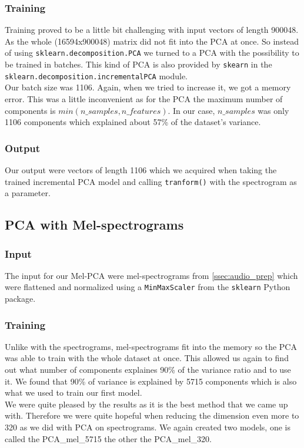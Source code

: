 \subsubsection{Training}
Training proved to be a little bit challenging with input vectors of length 900048. As the whole (16594x900048) matrix did not fit into the PCA at once. So instead of using \texttt{sklearn.decomposition.PCA} we turned to a PCA with the possibility to be trained in batches. This kind of PCA is also provided by \texttt{skearn} in the \texttt{sklearn.decomposition.incrementalPCA} module. \\ Our batch size was 1106. Again, when we tried to increase it, we got a memory error. This was a little inconvenient as for the PCA the maximum number of components is $min(n\_samples, n\_features)$. In our case, $n\_samples$ was only 1106 components which explained about 57\% of the dataset's variance.
\subsubsection{Output}
Our output were vectors of length 1106 which we acquired when taking the trained incremental PCA model and calling \texttt{tranform()} with the spectrogram as a parameter.

\subsection{PCA with Mel-spectrograms}
\subsubsection{Input}
The input for our Mel-PCA were mel-spectrograms from \ref{ssec:audio_prep} which were flattened and normalized using a \texttt{MinMaxScaler} from the \texttt{sklearn} Python package.

\subsubsection{Training}
Unlike with the spectrograms, mel-spectrograms fit into the memory so the PCA was able to train with the whole dataset at once. This allowed us again to find out what number of components explaines 90\% of the variance ratio and to use it. We found that 90\% of variance is explained by 5715 components which is also what we used to train our first model. \\
We were quite pleased by the results as it is the best method that we came up with. Therefore we were quite hopeful when reducing the dimension even more to 320 as we did with PCA on spectrograms. We again created two models, one is called the PCA\_mel\_5715 the other the PCA\_mel\_320. 

